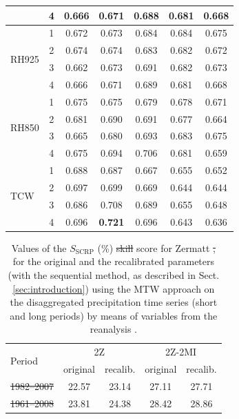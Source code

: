 \documentclass[hess, manuscript]{copernicus}
\providecommand{\DIFadd}[1]{{\protect\color{blue}\uwave{#1}}} %
\providecommand{\DIFdel}[1]{{\protect\color{red}\sout{#1}}}                      %
\providecommand{\DIFaddFL}[1]{\DIFadd{#1}} %
\providecommand{\DIFdelFL}[1]{\DIFdel{#1}} %
\providecommand{\DIFaddbeginFL}{} %
\providecommand{\DIFaddendFL}{} %
\providecommand{\DIFdelbeginFL}{} %
\providecommand{\DIFdelendFL}{} %
\begin{document}
\begin{table}[htb]
\begin{center}
\begin{tabular}{l c c c c c c}
				& 4 & 0.666 & 0.671 & 0.688 & 0.681 & 0.668 \\ \hline
				\multirow{ 4}{*}{RH925} & 1 & 0.672 & 0.673 & 0.684 & 0.684 & 0.675 \\
				& 2 & 0.674 & 0.674 & 0.683 & 0.682 & 0.672 \\
				& 3 & 0.662 & 0.673 & 0.691 & 0.682 & 0.673 \\
				& 4 & 0.666 & 0.671 & 0.689 & 0.681 & 0.668 \\ \hline
				\multirow{ 4}{*}{RH850} & 1 & 0.675 & 0.675 & 0.679 & 0.678 & 0.671 \\
				& 2 & 0.681 & 0.690 & 0.691 & 0.677 & 0.664 \\
				& 3 & 0.665 & 0.680 & 0.693 & 0.683 & 0.675 \\
				& 4 & 0.675 & 0.694 & 0.706 & 0.681 & 0.659 \\ \hline
				\multirow{ 4}{*}{TCW} & 1 & 0.688 & 0.687 & 0.667 & 0.655 & 0.652 \\
				& 2 & 0.697 & 0.699 & 0.669 & 0.644 & 0.644 \\
				& 3 & 0.686 & 0.708 & 0.689 & 0.655 & 0.648 \\
				& 4 & 0.696 & \textbf{0.721} & 0.696 & 0.643 & 0.636 \\ \hline
			\end{tabular}
		\end{center}
		\label{table:proxy_correlations}
	\end{table}

	\begin{table}[htb]
		\caption{Values of the \DIFdelbeginFL \DIFdelFL{$S_{\text{SCRP}}$ }\DIFdelendFL \DIFaddbeginFL \DIFaddFL{CRPSS }\DIFaddendFL (\%) \DIFdelbeginFL \DIFdelFL{skill }\DIFdelendFL score for Zermatt \DIFdelbeginFL \DIFdelFL{, }\DIFdelendFL for the original and the recalibrated parameters (with the sequential method, as described in Sect. \ref{sec:introduction}) using the MTW approach on the disaggregated precipitation time series (short and long periods) by means of \DIFaddbeginFL \DIFaddFL{proxy }\DIFaddendFL variables from the reanalysis \DIFaddbeginFL \DIFaddFL{dataset}\DIFaddendFL .}
		\begin{center}
			\begin{tabular}{l c c c c}
				\hline
				\multirow{2}{*}{Period} & \multicolumn{2}{c}{2Z} & \multicolumn{ 2}{c}{2Z-2MI} \\
				& original & recalib. & original & recalib. \\
				\hline
				\DIFdelbeginFL \DIFdelFL{1982--2007 }\DIFdelendFL \DIFaddbeginFL \DIFaddFL{1982\textendash 2007 }\DIFaddendFL & 22.57 & 23.14 & 27.11 & 27.71 \\
				\DIFdelbeginFL \DIFdelFL{1961--2008 }\DIFdelendFL \DIFaddbeginFL \DIFaddFL{1961\textendash 2008 }\DIFaddendFL & 23.81 & 24.38 & 28.42 & 28.86 \\
				\hline
			\end{tabular}
		\end{center}
		\label{table:proxy_CRPSS}
	\end{table}
\end{document}
